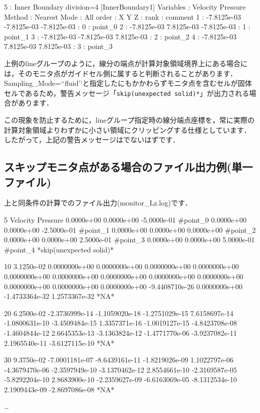 {\begin{program}
  5 : Inner Boundary     division=4  [InnerBoundary1]
    Variables : Velocity Pressure 
       Method : Nearest
         Mode : All
        order :            X            Y            Z  :   rank : comment
            1 :  -7.8125e-03  -7.8125e-03  -7.8125e-03  :      0 : point_0
            2 :  -7.8125e-03   7.8125e-03  -7.8125e-03  :      1 : point_1
            3 :  -7.8125e-03  -7.8125e-03   7.8125e-03  :      2 : point_2
            4 :  -7.8125e-03   7.8125e-03   7.8125e-03  :      3 : point_3
\end{program}
}

上例のlineグループのように，線分の端点が計算対象領域境界上にある場合には，そのモニタ点がガイドセル側に属すると判断されることがあります．
Sampling\_Mode=\lq\lq fluid\rq\rq と指定したにもかかわらずモニタ点を含むセルが固体セルであるため，警告メッセージ「{\tt  *skip(unexpected solid)*}」が出力される場合があります．

この現象を防止するために，lineグループ指定時の線分端点座標を，常に実際の計算対象領域よりわずかに小さい領域にクリッピングする仕様としています．
したがって，上記の警告メッセージはでないはずです．


\subsection{スキップモニタ点がある場合のファイル出力例(単一ファイル)}
上と同条件の計算でのファイル出力(monitor\_Lz.log)です．

{\small
\begin{program}
5 Velocity Pressure 
  0.0000e+00   0.0000e+00  -5.0000e-01  #point_0
  0.0000e+00   0.0000e+00  -2.5000e-01  #point_1
  0.0000e+00   0.0000e+00   0.0000e+00  #point_2
  0.0000e+00   0.0000e+00   2.5000e-01  #point_3
  0.0000e+00   0.0000e+00   5.0000e-01  #point_4  *skip(unexpected solid)*

10   3.1250e-02
  0.0000000e+00   0.0000000e+00   0.0000000e+00   0.0000000e+00 
  0.0000000e+00   0.0000000e+00   0.0000000e+00   0.0000000e+00 
  0.0000000e+00   0.0000000e+00   0.0000000e+00   0.0000000e+00 
 -9.4408710e-26   0.0000000e+00  -1.4733364e-32   1.2573367e-32 
  *NA*

20   6.2500e-02
 -2.3736999e-14  -1.1059020e-18  -1.2751029e-15   7.6158697e-14 
 -1.0800631e-10  -3.4509484e-15   1.3357371e-16  -1.0019127e-15 
 -4.8423708e-08  -1.4604844e-12   2.6645353e-13  -3.1363824e-12 
 -1.4771770e-06  -3.9237082e-11   2.1965540e-11  -3.6127115e-10 
  *NA*

30   9.3750e-02
 -7.0001181e-07  -8.6439161e-11  -1.8219026e-09   1.1022797e-06 
 -4.3679470e-06  -2.3597949e-10  -3.1370462e-12   2.8554661e-10 
 -2.3169587e-05  -5.8292204e-10   2.8683900e-10  -2.2359627e-09 
 -6.6163069e-05  -8.1312534e-10   2.1909443e-09  -2.8697086e-08 
  *NA*

…
\end{program}
}
